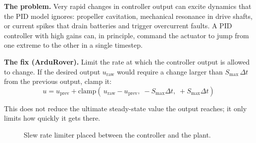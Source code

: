 \documentclass[../../book.tex]{subfiles}
\begin{document}
\textbf{The problem.}
Very rapid changes in controller output can excite dynamics that the PID
model ignores: propeller cavitation, mechanical resonance in drive shafts,
or current spikes that drain batteries and trigger overcurrent faults.
A PID controller with high gains can, in principle, command the actuator to
jump from one extreme to the other in a single timestep.

\textbf{The fix (ArduRover).}
Limit the rate at which the controller output is allowed to change.  If the
desired output $u_\mathrm{raw}$ would require a change larger than
$S_\mathrm{max}\,\Delta t$ from the previous output, clamp it:
\begin{equation}
  u = u_\mathrm{prev} + \mathrm{clamp}\!\left(\,u_\mathrm{raw} - u_\mathrm{prev},\;
      -S_\mathrm{max}\Delta t,\; +S_\mathrm{max}\Delta t\right)
\end{equation}

This does not reduce the ultimate steady-state value the output reaches; it
only limits how quickly it gets there.

\begin{figure}[htbp]
\centering
{}
\caption{Slew rate limiter placed between the controller and the plant.}
\label{fig:slewrate}
\end{figure}
\end{document}

